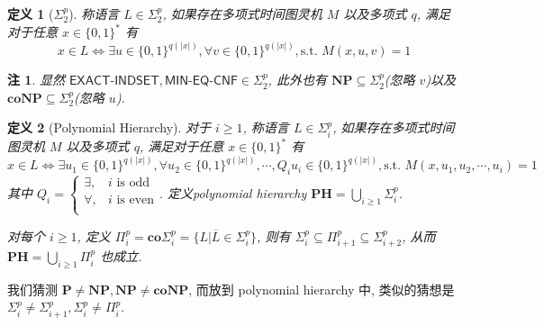 \documentclass[8pt]{article}
\theoremstyle{compact}
\newtheorem{definition}{定义}[section]
\newtheorem{remark}{注}[section]
\def\ge{\geqslant}
\def\P{\textbf{P}}
\def\NP{\textbf{NP}}
\def\coNP{\textbf{coNP}}
\def\PH{\textbf{PH}}
\begin{document}
\begin{definition}[$\Sigma_2^p$]
	称语言 $L \in \Sigma_2^p$, 如果存在多项式时间图灵机 $M$ 以及多项式 $q$, 满足对于任意 $x \in \{0, 1\}^*$ 有 $$x \in L \Leftrightarrow \exists u \in \{0, 1\}^{q(|x|)}, \forall v \in \{0, 1\}^{q(|x|)}, \text{s.t. } M(x, u, v) = 1$$
\end{definition}
\begin{remark}
	显然 $\textsf{EXACT-INDSET}, \textsf{MIN-EQ-CNF} \in \Sigma_2^p$, 此外也有 $\NP \subseteq \Sigma_2^p$(忽略 $v$)以及 $\coNP \subseteq \Sigma_2^p$(忽略 $u$).
\end{remark}
\begin{definition}[Polynomial Hierarchy]
	对于 $i \ge 1$, 称语言 $L \in \Sigma_i^p$, 如果存在多项式时间图灵机 $M$ 以及多项式 $q$, 满足对于任意 $x \in \{0, 1\}^*$ 有 $$x \in L \Leftrightarrow \exists u_1 \in \{0, 1\}^{q(|x|)}, \forall u_2 \in \{0, 1\}^{q(|x|)}, \cdots, Q_i u_i \in \{0, 1\}^{q(|x|)}, \text{s.t. } M(x, u_1, u_2, \cdots, u_i) = 1$$
	其中 $Q_i = \begin{cases}
		\exists, & i \text{ is odd}\\
		\forall, & i \text{ is even}\\
	\end{cases}$. 定义polynomial hierarchy $\PH = \bigcup_{i \ge 1} \Sigma_i^p$.

	对每个 $i \ge 1$, 定义 $\Pi_i^p = \textbf{co}\Sigma_i^p = \{L | \overline{L} \in \Sigma_i^p\}$, 则有 $\Sigma_i^p \subseteq \Pi_{i+1}^p \subseteq \Sigma_{i+2}^p$, 从而 $\PH = \bigcup_{i \ge 1}\Pi_i^p$ 也成立.
\end{definition}

我们猜测 $\P \neq \NP, \NP \neq \coNP$, 而放到 polynomial hierarchy 中, 类似的猜想是 $\Sigma_i^p \neq \Sigma_{i+1}^p, \Sigma_i^p \neq \Pi_i^p$.
\end{document}
